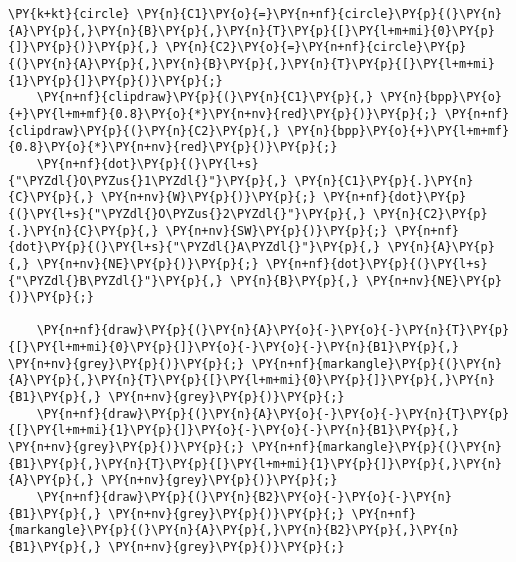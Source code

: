 \begin{Verbatim}[commandchars=\\\{\}]
    \PY{k+kt}{circle} \PY{n}{C1}\PY{o}{=}\PY{n+nf}{circle}\PY{p}{(}\PY{n}{A}\PY{p}{,}\PY{n}{B}\PY{p}{,}\PY{n}{T}\PY{p}{[}\PY{l+m+mi}{0}\PY{p}{]}\PY{p}{)}\PY{p}{,} \PY{n}{C2}\PY{o}{=}\PY{n+nf}{circle}\PY{p}{(}\PY{n}{A}\PY{p}{,}\PY{n}{B}\PY{p}{,}\PY{n}{T}\PY{p}{[}\PY{l+m+mi}{1}\PY{p}{]}\PY{p}{)}\PY{p}{;}
    \PY{n+nf}{clipdraw}\PY{p}{(}\PY{n}{C1}\PY{p}{,} \PY{n}{bpp}\PY{o}{+}\PY{l+m+mf}{0.8}\PY{o}{*}\PY{n+nv}{red}\PY{p}{)}\PY{p}{;} \PY{n+nf}{clipdraw}\PY{p}{(}\PY{n}{C2}\PY{p}{,} \PY{n}{bpp}\PY{o}{+}\PY{l+m+mf}{0.8}\PY{o}{*}\PY{n+nv}{red}\PY{p}{)}\PY{p}{;}
    \PY{n+nf}{dot}\PY{p}{(}\PY{l+s}{"\PYZdl{}O\PYZus{}1\PYZdl{}"}\PY{p}{,} \PY{n}{C1}\PY{p}{.}\PY{n}{C}\PY{p}{,} \PY{n+nv}{W}\PY{p}{)}\PY{p}{;} \PY{n+nf}{dot}\PY{p}{(}\PY{l+s}{"\PYZdl{}O\PYZus{}2\PYZdl{}"}\PY{p}{,} \PY{n}{C2}\PY{p}{.}\PY{n}{C}\PY{p}{,} \PY{n+nv}{SW}\PY{p}{)}\PY{p}{;} \PY{n+nf}{dot}\PY{p}{(}\PY{l+s}{"\PYZdl{}A\PYZdl{}"}\PY{p}{,} \PY{n}{A}\PY{p}{,} \PY{n+nv}{NE}\PY{p}{)}\PY{p}{;} \PY{n+nf}{dot}\PY{p}{(}\PY{l+s}{"\PYZdl{}B\PYZdl{}"}\PY{p}{,} \PY{n}{B}\PY{p}{,} \PY{n+nv}{NE}\PY{p}{)}\PY{p}{;}

    \PY{n+nf}{draw}\PY{p}{(}\PY{n}{A}\PY{o}{-}\PY{o}{-}\PY{n}{T}\PY{p}{[}\PY{l+m+mi}{0}\PY{p}{]}\PY{o}{-}\PY{o}{-}\PY{n}{B1}\PY{p}{,} \PY{n+nv}{grey}\PY{p}{)}\PY{p}{;} \PY{n+nf}{markangle}\PY{p}{(}\PY{n}{A}\PY{p}{,}\PY{n}{T}\PY{p}{[}\PY{l+m+mi}{0}\PY{p}{]}\PY{p}{,}\PY{n}{B1}\PY{p}{,} \PY{n+nv}{grey}\PY{p}{)}\PY{p}{;}
    \PY{n+nf}{draw}\PY{p}{(}\PY{n}{A}\PY{o}{-}\PY{o}{-}\PY{n}{T}\PY{p}{[}\PY{l+m+mi}{1}\PY{p}{]}\PY{o}{-}\PY{o}{-}\PY{n}{B1}\PY{p}{,} \PY{n+nv}{grey}\PY{p}{)}\PY{p}{;} \PY{n+nf}{markangle}\PY{p}{(}\PY{n}{B1}\PY{p}{,}\PY{n}{T}\PY{p}{[}\PY{l+m+mi}{1}\PY{p}{]}\PY{p}{,}\PY{n}{A}\PY{p}{,} \PY{n+nv}{grey}\PY{p}{)}\PY{p}{;}
    \PY{n+nf}{draw}\PY{p}{(}\PY{n}{B2}\PY{o}{-}\PY{o}{-}\PY{n}{B1}\PY{p}{,} \PY{n+nv}{grey}\PY{p}{)}\PY{p}{;} \PY{n+nf}{markangle}\PY{p}{(}\PY{n}{A}\PY{p}{,}\PY{n}{B2}\PY{p}{,}\PY{n}{B1}\PY{p}{,} \PY{n+nv}{grey}\PY{p}{)}\PY{p}{;}
\end{Verbatim}
